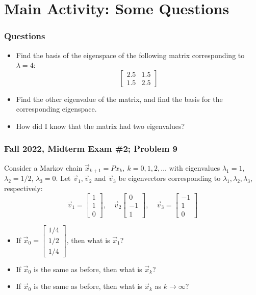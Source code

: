\documentclass{beamer}
\begin{document}
	\section{Main Activity: Some Questions}
	\begin{frame}
		\frametitle{Questions}
		\begin{itemize}
			\item<1-> Find the basis of the eigenspace of the following matrix corresponding to \(\lambda = 4\): 
					\[\begin{bmatrix}2.5 & 1.5 \\ 1.5 & 2.5\end{bmatrix}\]
			\item<2-> Find the other eigenvalue of the matrix, and find the basis for the corresponding eigenspace.
			\item<3-> How did I know that the matrix had two eigenvalues?
			\end{itemize}
	\end{frame}

	\begin{frame}
		\frametitle{Fall 2022, Midterm Exam \#2; Problem 9}
		Consider a Markov chain \(\vec{x}_{k + 1} = Px_{k}, \ k = 0, 1, 2, \dots\) with eigenvalues \(\lambda_1 = 1\), \(\lambda_2 = 1/2\), \(\lambda_3 = 0\).
		Let \(\vec{v}_1, \vec{v}_2\) and \(\vec{v}_3\) be eigenvectors corresponding to \(\lambda_1, \lambda_2, \lambda_3\), respectively:
		\[\vec{v}_1 = \begin{bmatrix}1 \\ 1 \\ 0\end{bmatrix}, \quad
		  \vec{v}_2 \begin{bmatrix}0 \\ -1 \\ 1\end{bmatrix}, \quad
		  \vec{v}_3 = \begin{bmatrix}-1 \\ 1 \\ 0\end{bmatrix}\]\pause
		\begin{itemize}
			\item<2->If \(\vec{x}_0 = \begin{bmatrix}1/4 \\ 1/2 \\ 1/4\end{bmatrix}\), then what is \(\vec{x}_1\)?
			\item<3->If \(\vec{x}_0\) is the same as before, then what is \(\vec{x}_k\)?
			\item<4->If \(\vec{x}_0\) is the same as before, then what is \(\vec{x}_k\) as \(k \to \infty\)?		
		\end{itemize}
	\end{frame}
\end{document}
